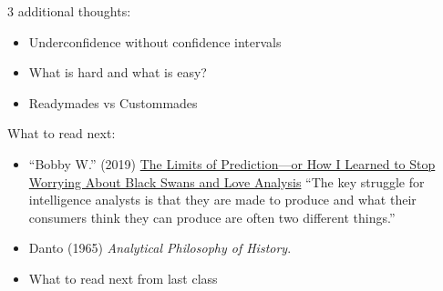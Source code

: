 \documentclass[aspectratio=169]{beamer}
\begin{document}
{
\begin{frame}[plain]

\vspace{3.58in}
\hspace{-0.32in}
\end{frame}
}
\begin{frame}

3 additional thoughts:
\begin{itemize}
\item Underconfidence without confidence intervals
\item What is hard and what is easy?
\item Readymades vs Custommades
\end{itemize}

\end{frame}
\begin{frame}

What to read next:
\begin{itemize}
\item ``Bobby W.'' (2019) \href{https://www.cia.gov/library/center-for-the-study-of-intelligence/csi-publications/csi-studies/studies/vol-63-no-4/Limits-of-Prediction.html}{The Limits of Prediction---or How I Learned to Stop Worrying About Black Swans and Love Analysis} ``The key struggle for intelligence analysts is that they are made to produce and what their consumers think they can produce are often two different things.''
\item Danto (1965) \textit{Analytical Philosophy of History}.
\item What to read next from last class
\end{itemize}

\end{frame}
\frame{\titlepage}
\end{document}
